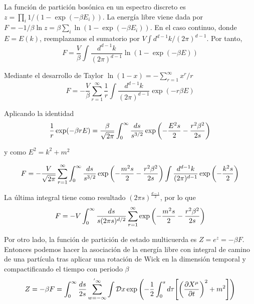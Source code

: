 
La función de partición bosónica en un espectro discreto es $z=\prod_i 1/(1-\exp(-\beta E_i))$.
La energía libre viene dada por $F=-1/\beta \ln z=\beta\sum_i \ln(1-\exp(-\beta E_i))$.
En el caso continuo, donde $E=E(k)$, reemplazamos el sumatorio por $V\int d^{d-1}k/(2\pi)^{d-1}$.
Por tanto,
\begin{equation}
  F=\frac{V}{\beta}\int \frac{d^{d-1}k}{(2\pi)^{d-1}}\ln(1-\exp(-\beta E))
\end{equation}

Mediante el desarrollo de Taylor $\ln(1-x)=-\sum^\infty_{r=1} x^r/r$
\begin{equation}
  F=-\frac{V}{\beta}\sum^\infty_{r=1} \frac 1 r\int \frac{d^{d-1}k}{(2\pi)^{d-1}}\exp(-r\beta E)
\end{equation}

Aplicando la identidad
\begin{equation}
  \frac 1 r \exp(-\beta r E)=\frac{\beta}{\sqrt{2\pi}}\int_0^\infty \frac{ds}{s^{3/2}}\exp\qty(-\frac{E^2s}{2}-\frac{r^2\beta^2}{2s})
\end{equation}

y como $E^2=k^2+m^2$

\begin{equation}
  F=-\frac{V}{\sqrt{2\pi}}\sum^\infty_{r=1} \int_0^\infty \frac{ds}{s^{3/2}} \exp \qty(-\frac{m^2s}{2} -\frac{r^2\beta^2}{2s})
  \int \frac{d^{d-1}k}{(2\pi)^{d-1}}\exp\qty(-\frac{k^2s}{2})
\end{equation}

La última integral tiene como resultado $(2\pi s)^{\frac{d-1}{2}}$, por lo que
\begin{equation}
  F=-V \int_0^\infty \frac{ds}{s(2\pi s)^{d/2}}\sum^\infty_{r=1} \exp \qty(-\frac{m^2s}{2}- \frac{r^2\beta^2}{2s})
\end{equation}

Por otro lado, la función de partición de estado multicuerda es $Z=e^z=-\beta F$. 
Entonces podemos hacer la asociación de la energía libre con integral de camino de 
una partícula tras aplicar una rotación de Wick en la dimensión temporal y compactificando el
tiempo con periodo $\beta$
\begin{equation}
  Z=-\beta F= \int_0^\infty \frac{ds}{2s}\sum^{'\infty}_{w=-\infty} \int \mathcal{D}x 
  \exp\qty(-\frac 1 2 \int_0^s d\tau \qty[\qty(\pdv{X^\mu}{t})^2+m^2])
\end{equation}

